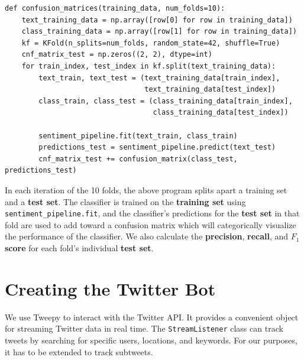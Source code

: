 \documentclass[11pt, twoside, reqno]{book}
\begin{document}
\begin{verbatim}
def confusion_matrices(training_data, num_folds=10):
    text_training_data = np.array([row[0] for row in training_data])
    class_training_data = np.array([row[1] for row in training_data])
    kf = KFold(n_splits=num_folds, random_state=42, shuffle=True)
    cnf_matrix_test = np.zeros((2, 2), dtype=int)
    for train_index, test_index in kf.split(text_training_data):
        text_train, text_test = (text_training_data[train_index],
                                 text_training_data[test_index])
        class_train, class_test = (class_training_data[train_index],
                                   class_training_data[test_index])

        sentiment_pipeline.fit(text_train, class_train)
        predictions_test = sentiment_pipeline.predict(text_test)
        cnf_matrix_test += confusion_matrix(class_test, predictions_test)
\end{verbatim}

\noindent
In each iteration of the 10 folds, the above program splits apart a training set and a \textbf{test set}. The classifier is trained on the \textbf{training set} using \verb|sentiment_pipeline.fit|, and the classifier's predictions for the \textbf{test set} in that fold are used to add toward a confusion matrix which will categorically visualize the performance of the classifier. We also calculate the \textbf{precision}, \textbf{recall}, and \textbf{$F_{1}$ score} for each fold's individual \textbf{test set}.

\section{Creating the Twitter Bot}
\label{creating_twitter_bot}

We use Tweepy to interact with the Twitter API. It provides a convenient object for streaming Twitter data in real time. The \verb|StreamListener| class can track tweets by searching for specific users, locations, and keywords. For our purposes, it has to be extended to track subtweets.
\end{document}
